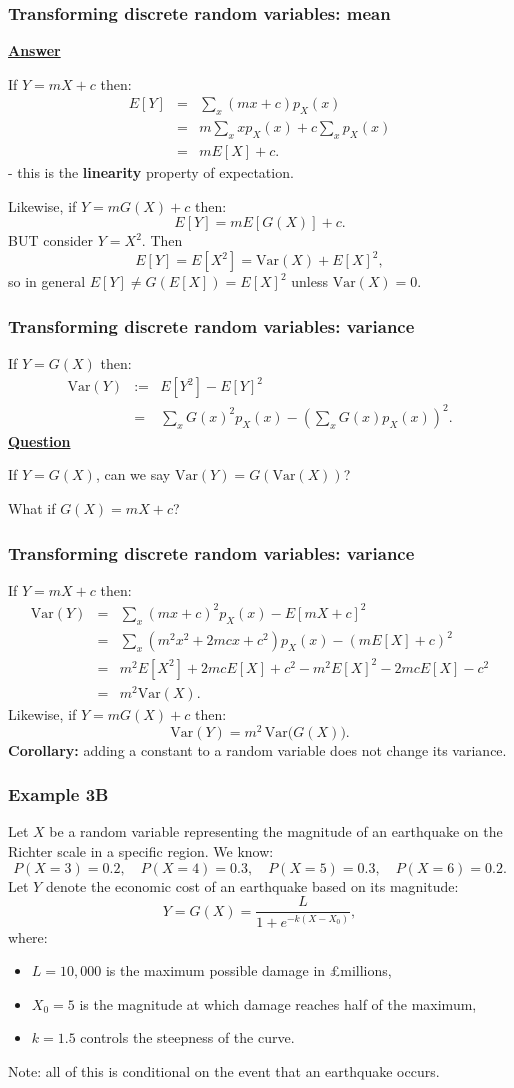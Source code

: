 \documentclass[t,8pt]{beamer}
\begin{document}
\begin{frame}
	\frametitle{Transforming discrete random variables: mean}
	{\bf\underline{Answer}} \par
	If $Y=mX+c$ then:
	\begin{eqnarray*}
		E[Y]&=&\sum_x (mx+c)p_X(x)\\
		&=&m\sum_x x p_X(x)+c\sum_x p_X(x)\\
		&=&mE[X]+c.
	\end{eqnarray*}
	- this is the {\bf linearity} property of expectation. \par
	Likewise, if $Y=mG(X)+c$ then:
	$$E[Y]=mE[G(X)]+c.$$
	BUT consider $Y=X^2$. Then
	$$E[Y]=E[X^2]=\mathrm{Var}(X)+E[X]^2,$$
	so in general $E[Y]\neq G(E[X])=E[X]^2$ unless $\mathrm{Var}(X)=0$.
\end{frame}

\begin{frame}
	\frametitle{Transforming discrete random variables: variance}
	If $Y=G(X)$ then:
	\begin{eqnarray*}
		\mathrm{Var}(Y)&:=&E[Y^2]-E[Y]^2\\
		&=&\sum_x G(x)^2 p_X(x) - \left(\sum_x G(x)p_X(x)\right)^2.
	\end{eqnarray*}
	{\bf\underline{Question}} \par
	If $Y=G(X)$, can we say $\mathrm{Var}(Y)=G(\mathrm{Var}(X))$? \par
	What if $G(X)=mX+c$?
\end{frame}

\begin{frame}
	\frametitle{Transforming discrete random variables: variance}
	If $Y=mX+c$ then:
	\begin{eqnarray*}
		\mathrm{Var}(Y)
		&=&\sum_x (mx+c)^2 p_X(x)-E[mX+c]^2\\
		&=&\sum_x (m^2x^2+2mcx+c^2)p_X(x)-(mE[X]+c)^2\\
		&=&m^2E[X^2]+2mcE[X]+c^2 - m^2E[X]^2-2mcE[X]-c^2\\
		&=&m^2\mathrm{Var}(X).
	\end{eqnarray*}
	Likewise, if $Y=mG(X)+c$ then:
	$$\mathrm{Var}(Y)=m^2\,\mathrm{Var}\big(G(X)\big).$$
	{\bf Corollary:} adding a constant to a random variable does not change its variance.
\end{frame}

\begin{frame}
	\frametitle{Example 3B}
	Let $X$ be a random variable representing the magnitude of an earthquake on the Richter scale in a specific region. We know:
	$$P(X=3)=0.2,\quad P(X=4)=0.3,\quad P(X=5)=0.3,\quad P(X=6)=0.2.$$
	Let $Y$ denote the economic cost of an earthquake based on its magnitude:
	$$Y=G(X)=\frac {L}{1+e^{-k(X-X_0)}},$$
	where:
	\begin{itemize}
		\item $L=10{,}000$ is the maximum possible damage in \pounds millions,
		\item $X_0=5$ is the magnitude at which damage reaches half of the maximum,
		\item $k=1.5$ controls the steepness of the curve.
	\end{itemize}
	Note: all of this is conditional on the event that an earthquake occurs.
\end{frame}
\end{document}
